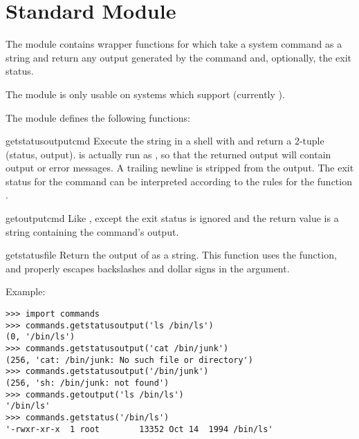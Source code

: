 \section{Standard Module }
\label{module-commands}

The  module contains wrapper functions for  
which take a system command as a string and return any output generated by 
the command and, optionally, the exit status.

The  module is only usable on systems which support 
 (currently \UNIX{}).

The  module defines the following functions:

\renewcommand{\indexsubitem}{(in module commands)}
\begin{funcdesc}{getstatusoutput}{cmd}
Execute the string  in a shell with  and return
a 2-tuple (status, output).   is actually run as
, so that the returned output will contain output
or error messages. A trailing newline is stripped from the output.
The exit status for the  command can be interpreted according to the
rules for the \C{} function .  
\end{funcdesc}

\begin{funcdesc}{getoutput}{cmd}
Like , except the exit status is ignored and
the return value is a string containing the command's output.  
\end{funcdesc}

\begin{funcdesc}{getstatus}{file}
Return the output of  as a string.  This
function uses the  function, and properly escapes
backslashes and dollar signs in the argument.
\end{funcdesc}

Example:

\begin{verbatim}
>>> import commands
>>> commands.getstatusoutput('ls /bin/ls')
(0, '/bin/ls')
>>> commands.getstatusoutput('cat /bin/junk')
(256, 'cat: /bin/junk: No such file or directory')
>>> commands.getstatusoutput('/bin/junk')
(256, 'sh: /bin/junk: not found')
>>> commands.getoutput('ls /bin/ls')
'/bin/ls'
>>> commands.getstatus('/bin/ls')
'-rwxr-xr-x  1 root        13352 Oct 14  1994 /bin/ls'
\end{verbatim}
